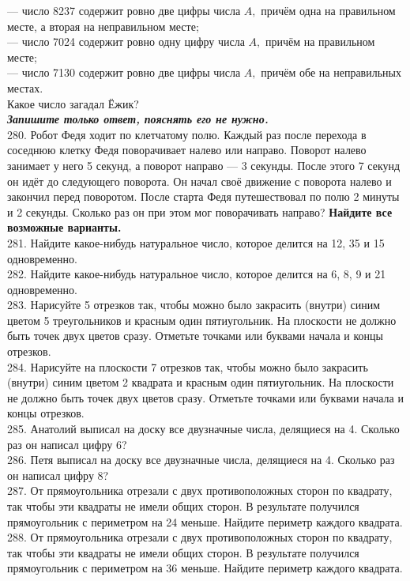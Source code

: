  --- число 8237 содержит ровно две цифры числа $A,$ причём одна на правильном месте, а вторая на неправильном месте;\\
 --- число 7024 содержит ровно одну цифру числа $A,$ причём на правильном месте;\\
 --- число 7130 содержит ровно две цифры числа $A,$ причём обе на неправильных местах.\\
 Какое число загадал Ёжик?\\
  {\it {\textbf {Запишите только ответ, пояснять его не нужно.}}}\\
280. Робот Федя ходит по клетчатому полю. Каждый раз после перехода в соседнюю клетку Федя поворачивает налево или направо. Поворот налево занимает у него 5 секунд, а поворот направо --- 3 секунды. После этого 7 секунд он идёт до следующего поворота. Он начал своё движение с поворота налево и закончил перед поворотом. После старта Федя путешествовал по полю 2 минуты и 2 секунды. Сколько раз он при этом мог поворачивать направо? {\textbf {Найдите все возможные варианты.}}\\
281. Найдите какое-нибудь натуральное число, которое делится на 12, 35 и 15 одновременно.\\
282. Найдите какое-нибудь натуральное число, которое делится на 6, 8, 9 и 21 одновременно.\\
283. Нарисуйте 5 отрезков так, чтобы можно было закрасить (внутри) синим цветом 5 треугольников и красным один пятиугольник. На плоскости не должно быть точек двух цветов сразу. Отметьте точками или буквами начала и концы отрезков.\\
284. Нарисуйте на плоскости 7 отрезков так, чтобы можно было закрасить (внутри) синим цветом 2 квадрата и красным один пятиугольник. На плоскости не должно быть точек двух цветов сразу. Отметьте точками или буквами начала и концы отрезков.\\
285. Анатолий выписал на доску все двузначные числа, делящиеся на 4. Сколько раз он написал цифру 6?\\
286. Петя выписал на доску все двузначные числа, делящиеся на 4. Сколько раз он написал цифру 8?\\
287. От прямоугольника отрезали с двух противоположных сторон по квадрату, так чтобы эти квадраты не имели общих сторон. В результате получился прямоугольник с периметром на 24 меньше. Найдите периметр каждого квадрата.\\
288. От прямоугольника отрезали с двух противоположных сторон по квадрату, так чтобы эти квадраты не имели общих сторон. В результате получился прямоугольник с периметром на 36 меньше. Найдите периметр каждого квадрата.\\
